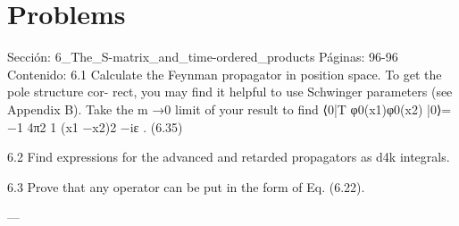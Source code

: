 \section*{Problems}
Sección: 6_The_S-matrix_and_time-ordered_products
Páginas: 96-96
Contenido:
6.1 Calculate the Feynman propagator in position space. To get the pole structure cor-
rect, you may ﬁnd it helpful to use Schwinger parameters (see Appendix B). Take
the m →0 limit of your result to ﬁnd
⟨0|T {φ0(x1)φ0(x2)} |0⟩= −1
4π2
1
(x1 −x2)2 −iε
.
(6.35)

6.2 Find expressions for the advanced and retarded propagators as d4k integrals.

6.3 Prove that any operator can be put in the form of Eq. (6.22).


---

